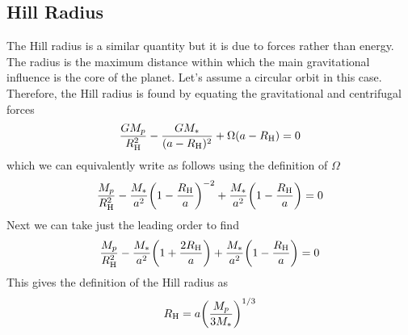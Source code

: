 \documentclass[twocolumn]{aastex631}
\begin{document}
\subsection{Hill Radius}
The Hill radius is a similar quantity but it is due to forces rather than energy. The radius is the maximum distance within which the main gravitational influence is the core of the planet. Let's assume a circular orbit in this case. Therefore, the Hill radius is found by equating the gravitational and centrifugal forces
\begin{equation}
    \frac{G M_p}{R_{\rm H}^2} - \frac{G M_*}{(a - R_{\rm H})^2} + \Omega (a - R_{\rm H}) = 0
\end{equation}
which we can equivalently write as follows using the definition of $\Omega$
\begin{equation}
    \frac{M_p}{R_{\rm H}^2} - \frac{M_*}{a^2} \qty(1 - \frac{R_{\rm H}}{a})^{-2} + \frac{M_*}{a^2} \qty(1 - \frac{R_{\rm H}}{a}) = 0
\end{equation}
Next we can take just the leading order to find
\begin{equation}
    \frac{M_p}{R_{\rm H}^2} - \frac{M_*}{a^2} \qty(1 + \frac{2 R_{\rm H}}{a}) + \frac{M_*}{a^2} \qty(1 - \frac{R_{\rm H}}{a}) = 0
\end{equation}
This gives the definition of the Hill radius as
\begin{equation}
    R_{\rm H} = a \qty(\frac{M_p}{3 M_*})^{1/3}
\end{equation}
\end{document}
